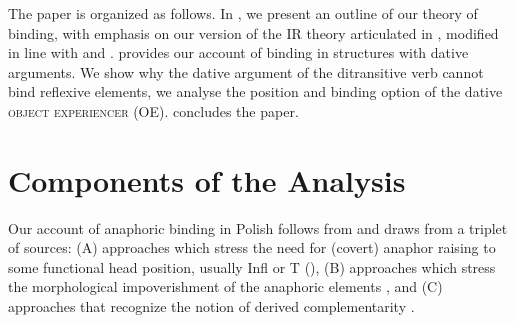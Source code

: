 \documentclass[output=paper,modfonts,nonflat
]{langsci/langscibook}
\begin{document}
The paper is organized as follows. In , we present an outline of our theory of binding, with emphasis on our version of the IR theory articulated in \cite{nikolaeva2014}, modified in line with \cite{boskovic2005locality,boskovic2012,boskovic2013,boskovic2014} and \cite{despic2011,despic2013,despic2015}.  provides our account of binding in structures with dative arguments. We show why the dative argument of the ditransitive verb cannot bind reflexive elements, we analyse the position and binding option of the dative \textsc{object experiencer} (OE).  concludes the paper.

\section{Components of the Analysis} \label{sec:witkos:s2}

Our account of anaphoric binding in Polish follows from and draws from a triplet of sources: (A) approaches which stress the need for (covert) anaphor raising to some functional head position, usually Infl or T (\citealt{vikner1985,chomsky1986,pica1987,pica1991,hestvik1992,avrutin1994,nikolaeva2014}), (B) approaches which stress the morphological impoverishment of the anaphoric elements \citep{burzio1991,burzio1996,safir2014}, and (C) approaches that recognize the notion of derived complementarity \citep{hellan1988,safir2004,boeckxetal2008}.
\end{document}
